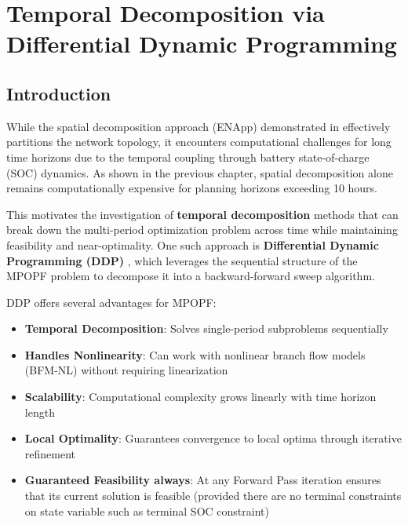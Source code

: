 \clearpage
\section{Temporal Decomposition via Differential Dynamic Programming}
\label{sec:ddp}

\subsection{Introduction}

While the spatial decomposition approach (ENApp) demonstrated in  effectively partitions the network topology, it encounters computational challenges for long time horizons due to the temporal coupling through battery state-of-charge (SOC) dynamics. As shown in the previous chapter, spatial decomposition alone remains computationally expensive for planning horizons exceeding 10 hours.

This motivates the investigation of \textbf{temporal decomposition} methods that can break down the multi-period optimization problem across time while maintaining feasibility and near-optimality. One such approach is \textbf{Differential Dynamic Programming (DDP)} \cite{ddp_sugar_01}, which leverages the sequential structure of the MPOPF problem to decompose it into a backward-forward sweep algorithm.

DDP offers several advantages for MPOPF:
\begin{itemize}
    \item \textbf{Temporal Decomposition}: Solves single-period subproblems sequentially
    \item \textbf{Handles Nonlinearity}: Can work with nonlinear branch flow models (BFM-NL) without requiring linearization
    \item \textbf{Scalability}: Computational complexity grows linearly with time horizon length
    \item \textbf{Local Optimality}: Guarantees convergence to local optima through iterative refinement
    \item \textbf{Guaranteed Feasibility always}: At any Forward Pass iteration ensures that its current solution is feasible (provided there are no terminal constraints on state variable such as terminal SOC constraint)
\end{itemize}

